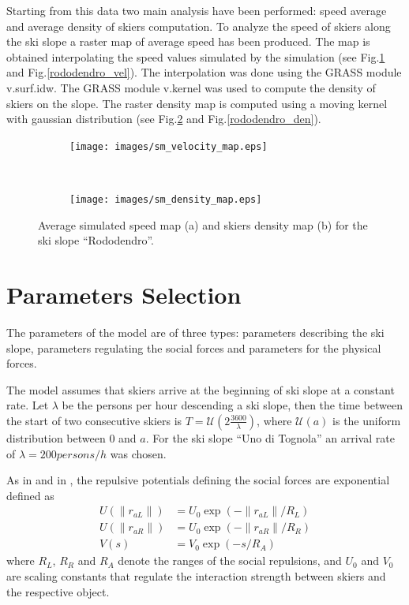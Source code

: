 \documentclass[12pt,a4paper,twoside]{book}
\newcommand{\norm}[1]{\lVert#1\rVert}
\begin{document}
Starting from this data two main analysis have been performed: speed average and average density of skiers computation. To analyze the speed of skiers along the ski slope a raster map of average speed has been produced. The map is obtained interpolating the speed values simulated by the simulation (see Fig.\ref{uno_tognola_vel} and Fig.\ref{rododendro_vel}). The interpolation was done using the GRASS module v.surf.idw. The GRASS module v.kernel was used to compute the density of skiers on the slope. The raster density map is computed using a moving kernel with gaussian distribution (see Fig.\ref{uno_tognola_den} and Fig.\ref{rododendro_den}).

\begin{figure}
        \centering
        \begin{subfigure}[b]{0.5\textwidth}
                \centering
                \texttt{[image: images/sm\_velocity\_map.eps]}
                \caption{}\label{uno_tognola_vel}
        \end{subfigure}%
        ~ %
        \begin{subfigure}[b]{0.5\textwidth}
                \centering
                \texttt{[image: images/sm\_density\_map.eps]}
                \caption{}\label{uno_tognola_den}
        \end{subfigure}
        \caption{Average simulated speed map (a) and skiers density map (b) for the ski slope ``Rododendro''.}\label{uno_tognola}
\end{figure}

\section{Parameters Selection}
The parameters of the model are of three types: parameters describing the ski slope, parameters regulating the social forces and parameters for the physical forces.

The model assumes that skiers arrive at the beginning of ski slope at a constant rate. Let $\lambda$ be the persons per hour descending a ski slope, then the time between the start of two consecutive skiers is $T=\mathcal{U}\left(2\frac{3600}{\lambda}\right)$, where $\mathcal{U}(a)$ is the uniform distribution between $0$ and $a$. For the ski slope ``Uno di Tognola'' an arrival rate of $\lambda=200 persons/h$ was chosen.

As in \cite{hol2012} and in \cite{hel2008}, the repulsive potentials defining the social forces are exponential defined as
\begin{align}
U(\norm{r_{aL}})&=U_0 \exp(-\norm{r_{aL}}/R_L) \\
U(\norm{r_{aR}})&=U_0 \exp(-\norm{r_{aR}}/R_R) \\
V(s)&=V_0 \exp(-s/R_A)
\end{align}
where $R_L$, $R_R$ and $R_A$ denote the ranges of the social repulsions, and $U_0$ and $V_0$ are scaling constants that regulate the interaction strength between skiers and the respective object.
\end{document}
